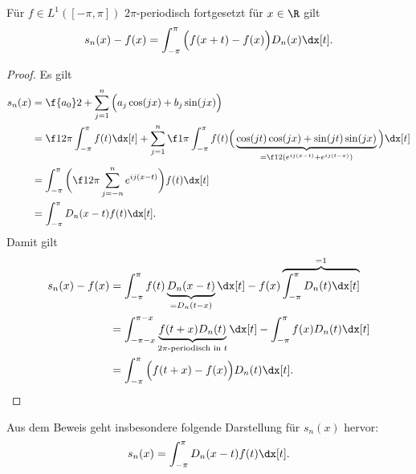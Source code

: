 \begin{lem} \label{3.26}
	Für $f \in L^1([-\pi, \pi])$ $2\pi$-periodisch fortgesetzt für $x\in \R$ gilt
	\begin{align*}
		s_n(x) - f(x) = \int_{-\pi}^{\pi} \Big(f(x+t) - f(x)\Big) D_n(x) \dx[t].
	\end{align*}
	\begin{proof}
		Es gilt
		\begin{align*}
			s_n(x)
			&= \f {a_0}2 + \sum_{j=1}^n \Big( a_j \cos(jx) + b_j \sin(jx) \Big) \\
			&= \f 1{2 \pi} \int_{-\pi}^{\pi} f(t) \dx[t] + \sum_{j=1}^n \f 1{\pi} \int_{-\pi}^{\pi} f(t) \Big( \underbrace{\cos(jt) \cos(jx) + \sin(jt) \sin(jx)}_{= \f 12 ( e^{ij(x-t)} + e^{ij(t-x)})} \Big) \dx[t] \\
			&= \int_{-\pi}^{\pi} \bigg( \f 1{2\pi} \sum_{j=-n}^n e^{ij(x-t)} \bigg) f(t) \dx[t] \\
			&= \int_{-\pi}^{\pi} D_n(x-t) f(t) \dx[t].
		\end{align*}
		Damit gilt
		\begin{align*}
			s_n(x) - f(x)
			&= \int_{-\pi}^{\pi} f(t) \underbrace{D_n(x-t)}_{=D_n(t-x)} \dx[t] - f(x) \overbrace{\int_{-\pi}^{\pi} D_n(t) \dx[t]}^{=1} \\
			&= \int_{-\pi-x}^{\pi-x} \underbrace{f(t + x)D_n(t)}_{\text{$2\pi$-periodisch in $t$}} \dx[t] - \int_{-\pi}^\pi f(x) D_n(t) \dx[t] \\
			&= \int_{-\pi}^{\pi} \Big( f(t + x) - f(x) \Big) D_n(t) \dx[t].
		\end{align*}
	\end{proof}
	\begin{note}
		Aus dem Beweis geht insbesondere folgende Darstellung für $s_n(x)$ hervor:
		\begin{align*}
			s_n(x) = \int_{-\pi}^{\pi} D_n(x-t) f(t) \dx[t].
		\end{align*}
	\end{note}
\end{lem}


